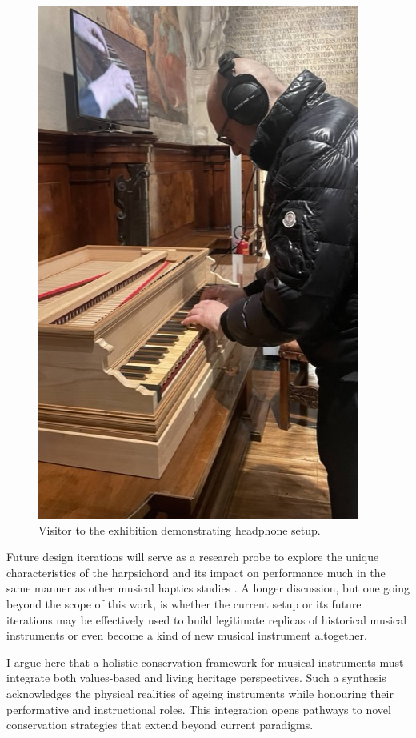 \begin{figure}
    \centering
    \includegraphics[width=0.33\linewidth]{img/exhibition-user-1.jpeg}
    \caption{Visitor to the exhibition demonstrating headphone setup.}
    \label{fig:user}
\vfill\end{figure}

Future design iterations will serve as a research probe to explore the unique characteristics of the harpsichord and its impact on performance much in the same manner as other musical haptics studies \cite{charalampos-saitis_musical_2018}. A longer discussion, but one going beyond the scope of this work, is whether the current setup or its future iterations may be effectively used to build legitimate replicas of historical musical instruments or even become a kind of new musical instrument altogether.

I argue here that a holistic conservation framework for musical instruments must integrate both values-based and living heritage perspectives. Such a synthesis acknowledges the physical realities of ageing instruments while honouring their performative and instructional roles. This integration opens pathways to novel conservation strategies that extend beyond current paradigms.
